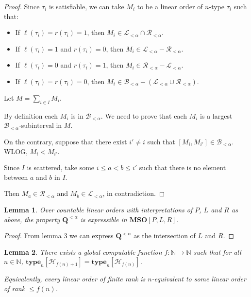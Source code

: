 \documentclass{article}
\newtheorem{lemma}{Lemma}
\newcommand{\brackets}[1]{\left[ {#1} \right]}
\newcommand{\mso}{\mathbf{MSO}}
\newcommand{\qq}{\mathbf{Q}}
\newcommand{\NN}{\mathbb{N}}
\newcommand{\type}[2]{\mathbf{type}_{#1} \brackets{#2}}
\begin{document}
\begin{proof}
  Since $\tau_i$ is satisfiable, we can take $M_i$ to be a linear order of $n$-type
  $\tau_i$ such that:

  \begin{itemize}
    \item If $\ell(\tau_i) = r(\tau_i) = 1$, then $M_i \in \mathcal{L}_{< \alpha} \cap \mathcal{R}_{< \alpha}$.
    \item If $\ell(\tau_i) = 1$ and $r(\tau_i) = 0$, then $M_i \in \mathcal{L}_{< \alpha} - \mathcal{R}_{< \alpha}$.
    \item If $\ell(\tau_i) = 0$ and $r(\tau_i) = 1$, then $M_i \in \mathcal{R}_{< \alpha} - \mathcal{L}_{< \alpha}$.
    \item If $\ell(\tau_i) = r(\tau_i) = 0$, then $M_i \in \mathcal{B}_{< \alpha} - (\mathcal{L}_{< \alpha} \cup \mathcal{R}_{< \alpha})$.
  \end{itemize}

  Let $M = \sum_{i \in I} M_i$.

  By definition each $M_i$ is in $\mathcal{B}_{< \alpha}$. We need to prove
  that each $M_i$ is a largest $\mathcal{B}_{< \alpha}$-subinterval in $M$.

  On the contrary, suppose that there exist $i' \ne i$ such that $[M_i, M_{i'}] \in \mathcal{B}_{< \alpha}$.
  WLOG, $M_i < M_{i'}$.

  Since $I$ is scattered, take some $i \le a < b \le i'$ such that
  there is no element between $a$ and $b$ in $I$.

  Then $M_a \in \mathcal{R}_{< \alpha}$ and $M_b \in \mathcal{L}_{< \alpha}$, in contradiction.
\end{proof}

\begin{lemma}
  Over countable linear orders with interpretations of $P$, $L$ and $R$ as above, the property
  $\qq^{< \alpha}$ is expressible in $\mso[P, L, R]$.
\end{lemma}

\begin{proof}
  From lemma 3 we can express $\qq^{< \alpha}$ as the intersection
  of $L$ and $R$.
\end{proof}


\begin{lemma}
  There exists a global computable function $f : \NN \to \NN$ such that
  for all $n \in \NN$,
  $\type{n}{\mathcal{H}_{f(n) + 1}} = \type{n}{\mathcal{H}_{f(n)}}$.

  Equivalently, every linear order of finite rank is $n$-equivalent to some linear order of rank $\le f(n)$.
\end{lemma}
\end{document}
